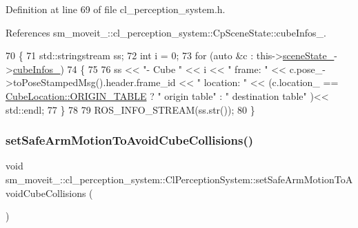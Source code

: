 Definition at line 69 of file cl\+\_\+perception\+\_\+system.\+h.



References sm\+\_\+moveit\+\_\+::cl\+\_\+perception\+\_\+system\+::\+Cp\+Scene\+State\+::cube\+Infos\+\_\+.


\begin{DoxyCode}
70             \{
71                 std::stringstream ss;
72                 \textcolor{keywordtype}{int} i = 0;
73                 \textcolor{keywordflow}{for} (\textcolor{keyword}{auto} &c : this->\hyperlink{classsm__moveit__4_1_1cl__perception__system_1_1ClPerceptionSystem_a82ea8feeb2fa43349f91ed59137b3890}{sceneState\_}->\hyperlink{classsm__moveit__4_1_1cl__perception__system_1_1CpSceneState_a734a45934cccf19ac5c886cd94bc8cda}{cubeInfos\_})
74                 \{
75 
76                     ss << \textcolor{stringliteral}{"- Cube "} << i << \textcolor{stringliteral}{" frame: "} << c.pose\_->toPoseStampedMsg().header.frame\_id << \textcolor{stringliteral}{"
       location: "} << (c.location\_ == \hyperlink{namespacesm__moveit__4_1_1cl__perception__system_a0d1b8834532a7cf9d19670791eece6d1ae5ee34c3ef8ec4a46a00a218416c7b1d}{CubeLocation::ORIGIN\_TABLE} ? \textcolor{stringliteral}{" origin table"} : \textcolor{stringliteral}{"
       destination table"} )<< std::endl;
77                 \}
78 
79                 ROS\_INFO\_STREAM(ss.str());
80             \}
\end{DoxyCode}
\mbox{\label{classsm__moveit__4_1_1cl__perception__system_1_1ClPerceptionSystem_a5304dc8734488564093525dfe4f4bcd1}} 
\subsubsection{\texorpdfstring{set\+Safe\+Arm\+Motion\+To\+Avoid\+Cube\+Collisions()}{setSafeArmMotionToAvoidCubeCollisions()}}
{\footnotesize\ttfamily void sm\+\_\+moveit\+\_\+::cl\+\_\+perception\+\_\+system\+::\+Cl\+Perception\+System\+::set\+Safe\+Arm\+Motion\+To\+Avoid\+Cube\+Collisions (\begin{DoxyParamCaption}{ }\end{DoxyParamCaption})\hspace{0.3cm}{\ttfamily [inline]}}



